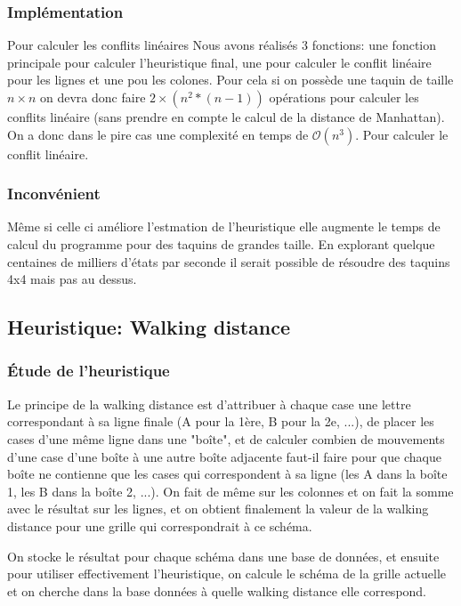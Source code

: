 \documentclass[a4paper, 12pt]{article}
\begin{document}
\subsubsection{Implémentation}

Pour calculer les conflits linéaires Nous avons réalisés 3 fonctions: une fonction principale pour calculer l'heuristique final, une pour calculer le conflit linéaire pour les lignes et une pou les colones. Pour cela si on possède une taquin de taille $n \times n$ on devra donc faire $2 \times (n^2*(n-1))$ opérations pour calculer les conflits linéaire (sans prendre en compte le calcul de la distance de Manhattan).
On a donc dans le pire cas une complexité en temps de $ \mathcal{O}(n^3)$. Pour calculer le conflit linéaire.

\subsubsection{Inconvénient}

Même si celle ci améliore l'estmation de l'heuristique elle augmente le temps de calcul du programme pour des taquins de grandes taille. En explorant quelque centaines de milliers d'états par seconde il serait possible de résoudre des taquins 4x4 mais pas au dessus.

\subsection{Heuristique: Walking distance}

\subsubsection{Étude de l'heuristique}

Le principe de la walking distance est d'attribuer à chaque case une lettre correspondant à sa ligne finale (A pour la 1ère, B pour la 2e, ...), de placer les cases d'une même ligne dans une "boîte", et de calculer combien de mouvements d'une case d'une boîte à une autre boîte adjacente faut-il faire pour que chaque boîte ne contienne que les cases qui correspondent à sa ligne (les A dans la boîte 1, les B dans la boîte 2, ...).
On fait de même sur les colonnes et on fait la somme avec le résultat sur les lignes, et on obtient finalement la valeur de la walking distance pour une grille qui correspondrait à ce schéma.

On stocke le résultat pour chaque schéma dans une base de données, et ensuite pour utiliser effectivement l'heuristique, on calcule le schéma de la grille actuelle et on cherche dans la base données à quelle walking distance elle correspond.
\end{document}

